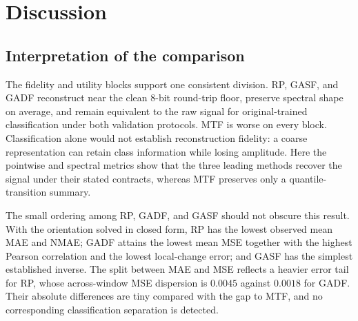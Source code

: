 \documentclass[5p]{elsarticle}
\begin{document}
\begin{table}[!htbp]
\centering
\caption{Compact decoder-ablation summary. MAE is in physical units (m/s\(^2\)); the sample and controlled factors for each row are detailed in the Supplementary Material.}\label{tab:ablation_summary}
\small
{}
\end{table}

\section{Discussion}\label{sec:discussion}

\subsection{Interpretation of the comparison}\label{sec:disc_pointwise}

The fidelity and utility blocks support one consistent division. RP, GASF, and GADF reconstruct near the clean 8-bit round-trip floor, preserve spectral shape on average, and remain equivalent to the raw signal for original-trained classification under both validation protocols. MTF is worse on every block. Classification alone would not establish reconstruction fidelity: a coarse representation can retain class information while losing amplitude. Here the pointwise and spectral metrics show that the three leading methods recover the signal under their stated contracts, whereas MTF preserves only a quantile-transition summary.

The small ordering among RP, GADF, and GASF should not obscure this result. With the orientation solved in closed form, RP has the lowest observed mean MAE and NMAE; GADF attains the lowest mean MSE together with the highest Pearson correlation and the lowest local-change error; and GASF has the simplest established inverse. The split between MAE and MSE reflects a heavier error tail for RP, whose across-window MSE dispersion is \(0.0045\) against \(0.0018\) for GADF. Their absolute differences are tiny compared with the gap to MTF, and no corresponding classification separation is detected.
\end{document}
